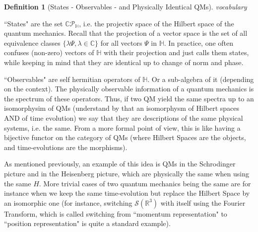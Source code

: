 \documentclass[a4paper,11pt]{article}
\numberwithin{equation}{section}
\theoremstyle{definition}
\newtheorem{definition}{Definition}
\begin{document}
\begin{definition}[States - Observables - and Physically Identical QMs] \emph{vocabulary}


``States" are the set $\mathbb{C}\mathcal{P}_\mathbb{H}$, i.e. the projectiv space of the Hilbert space of the quantum mechanics. Recall that the projection of a vector space is the set of all equivalence classes $\{\lambda \Psi, \lambda\in\mathbb{C}\}$ for all vectors $\Psi$ in $\mathbb{H}$. In practice, one often confuses (non-zero) vectors of $\mathbb{H}$ with their projection and just calls them states, while keeping in mind that they are identical up to change of norm and phase.

``Observables" are self hermitian operators of $\mathbb{H}$. Or a sub-algebra of it (depending on the context). The physically observable information of a quantum mechanics is the spectrum of these operators. Thus, if two QM yield the same spectra up to an isomorphysim of QMs (understand by that an isomorphysm of Hilbert spaces AND of time evolution) we say that they are descriptions of the same physical systems, i.e. the same. From a more formal point of view, this is like having a bijective functor on the category of QMs (where Hilbert Spaces are the objects, and time-evolutions are the morphisms).

As mentioned previously, an example of this idea is QMs in the Schrodinger picture and in the Heisenberg picture, which are physically the same when using the same $H$. More trivial cases of two quantum mechanics being the same are for instance when we keep the same time-evolution but replace the Hilbert Space by an isomorphic one (for instance, switching $\mathcal{S}(\mathbb{R}^3)$ with itself using the Fourier Transform, which is called switching from ``momentum representation" to ``position representation" is quite a standard example).    
\end{definition}
\end{document}
